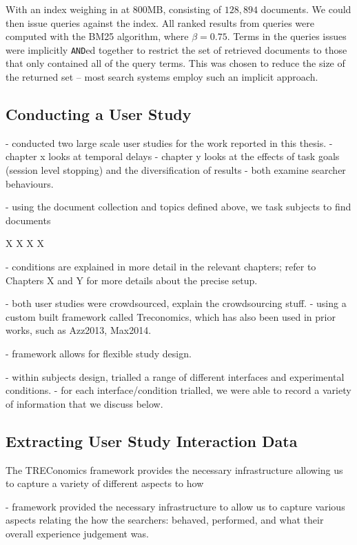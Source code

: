 With an index weighing in at 800MB, consisting of $128,894$ documents.  We could then issue queries against the index. All ranked results from queries were computed with the BM25 algorithm, where $\beta=0.75$. Terms in the queries issues were implicitly \texttt{AND}ed together to restrict the set of retrieved documents to those that only contained all of the query terms. This was chosen to reduce the size of the returned set -- most search systems employ such an implicit approach.

\subsection{Conducting a User Study}

- conducted two large scale user studies for the work reported in this thesis.
- chapter x looks at temporal delays
- chapter y looks at the effects of task goals (session level stopping) and the diversification of results
- both examine searcher behaviours.

- using the document collection and topics defined above, we task subjects to find documents 

X
X
X
X

- conditions are explained in more detail in the relevant chapters; refer to Chapters X and Y for more details about the precise setup.

- both user studies were crowdsourced, explain the crowdsourcing stuff.
- using a custom built framework called Treconomics, which has also been used in prior works, such as Azz2013, Max2014.

- framework allows for flexible study design.

- within subjects design, trialled a range of different interfaces and experimental conditions.
- for each interface/condition trialled, we were able to record a variety of information that we discuss below.


\subsection{Extracting User Study Interaction Data}\label{sec:csm:methodology:extracting}
The TREConomics framework provides the necessary infrastructure allowing us to capture a variety of different aspects to how

- framework provided the necessary infrastructure to allow us to capture various aspects relating the how the searchers: behaved, performed, and what their overall experience judgement was.


